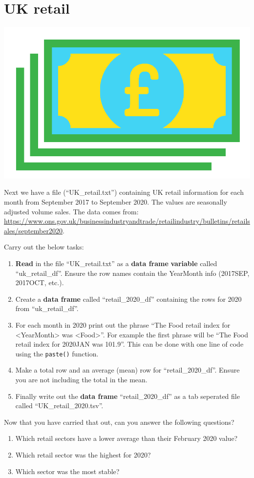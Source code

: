 \documentclass[]{book}
\providecommand{\tightlist}{%
  \setlength{\itemsep}{0pt}\setlength{\parskip}{0pt}}
\begin{document}
\section{UK retail}\label{uk-retail}

\begin{center}\includegraphics[width=0.2\linewidth]{figures/UKPounds} \end{center}

Next we have a file (``UK\_retail.txt'') containing UK retail
information for each month from September 2017 to September 2020. The
values are seasonally adjusted volume sales. The data comes from:
\url{https://www.ons.gov.uk/businessindustryandtrade/retailindustry/bulletins/retailsales/september2020}.

Carry out the below tasks:

\begin{enumerate}
\def\labelenumi{\arabic{enumi}.}
\tightlist
\item
  \textbf{Read} in the file ``UK\_retail.txt'' as a \textbf{data frame}
  \textbf{variable} called ``uk\_retail\_df''. Ensure the row names
  contain the YearMonth info (2017SEP, 2017OCT, etc.).
\item
  Create a \textbf{data frame} called ``retail\_2020\_df'' containing
  the rows for 2020 from ``uk\_retail\_df''.
\item
  For each month in 2020 print out the phrase ``The Food retail index
  for \textless{}YearMonth\textgreater{} was
  \textless{}Food\textgreater{}''. For example the first phrase will be
  ``The Food retail index for 2020JAN was 101.9''. This can be done with
  one line of code using the \texttt{paste()} function.
\item
  Make a total row and an average (mean) row for ``retail\_2020\_df''.
  Ensure you are not including the total in the mean.
\item
  Finally write out the \textbf{data frame} ``retail\_2020\_df'' as a
  tab seperated file called ``UK\_retail\_2020.tsv''.
\end{enumerate}

Now that you have carried that out, can you answer the following
questions?

\begin{enumerate}
\def\labelenumi{\arabic{enumi}.}
\tightlist
\item
  Which retail sectors have a lower average than their February 2020
  value?
\item
  Which retail sector was the highest for 2020?
\item
  Which sector was the most stable?
\end{enumerate}
\end{document}
